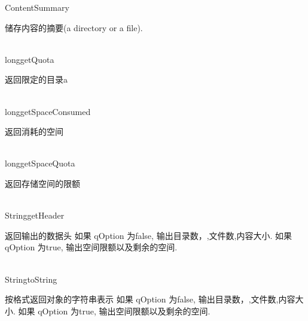 \begin{XeClass}{ContentSummary}
   
 储存内容的摘要(a directory or a file).

  \begin{XeMethod}{\XePublic\\ }{long}{getQuota}
       
 返回限定的目录a 

  \end{XeMethod}

  \begin{XeMethod}{\XePublic\\ }{long}{getSpaceConsumed}
       
 返回消耗的空间 

  \end{XeMethod}

  \begin{XeMethod}{\XePublic\\ }{long}{getSpaceQuota}
       
 返回存储空间的限额 

  \end{XeMethod}

  \begin{XeMethod}{\XePublic\\ }{String}{getHeader}
       
 返回输出的数据头
 如果 qOption 为false, 输出目录数，,文件数,内容大小.
 如果 qOption 为true, 输出空间限额以及剩余的空间.

  \end{XeMethod}

  \begin{XeMethod}{\XePublic\\ }{String}{toString}
       
 按格式返回对象的字符串表示
 如果 qOption 为false, 输出目录数，,文件数,内容大小.
 如果 qOption 为true, 输出空间限额以及剩余的空间.

  \end{XeMethod}

\end{XeClass}
